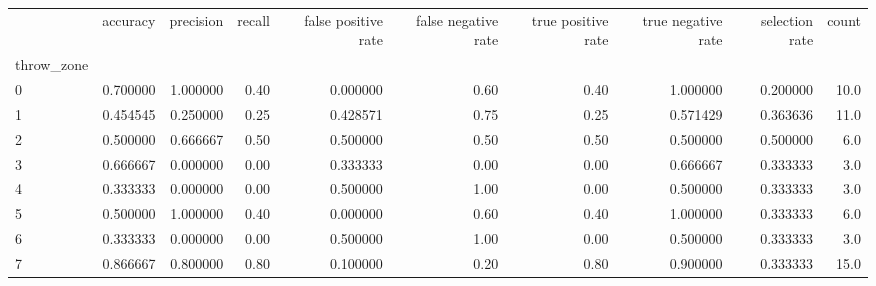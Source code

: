 \begin{tabular}{lrrrrrrrrr}
\toprule
{} &  accuracy &  precision &  recall &  false positive rate &  false negative rate &  true positive rate &  true negative rate &  selection rate &  count \\
throw\_zone &           &            &         &                      &                      &                     &                     &                 &        \\
\midrule
0          &  0.700000 &   1.000000 &    0.40 &             0.000000 &                 0.60 &                0.40 &            1.000000 &        0.200000 &   10.0 \\
1          &  0.454545 &   0.250000 &    0.25 &             0.428571 &                 0.75 &                0.25 &            0.571429 &        0.363636 &   11.0 \\
2          &  0.500000 &   0.666667 &    0.50 &             0.500000 &                 0.50 &                0.50 &            0.500000 &        0.500000 &    6.0 \\
3          &  0.666667 &   0.000000 &    0.00 &             0.333333 &                 0.00 &                0.00 &            0.666667 &        0.333333 &    3.0 \\
4          &  0.333333 &   0.000000 &    0.00 &             0.500000 &                 1.00 &                0.00 &            0.500000 &        0.333333 &    3.0 \\
5          &  0.500000 &   1.000000 &    0.40 &             0.000000 &                 0.60 &                0.40 &            1.000000 &        0.333333 &    6.0 \\
6          &  0.333333 &   0.000000 &    0.00 &             0.500000 &                 1.00 &                0.00 &            0.500000 &        0.333333 &    3.0 \\
7          &  0.866667 &   0.800000 &    0.80 &             0.100000 &                 0.20 &                0.80 &            0.900000 &        0.333333 &   15.0 \\
\bottomrule
\end{tabular}

